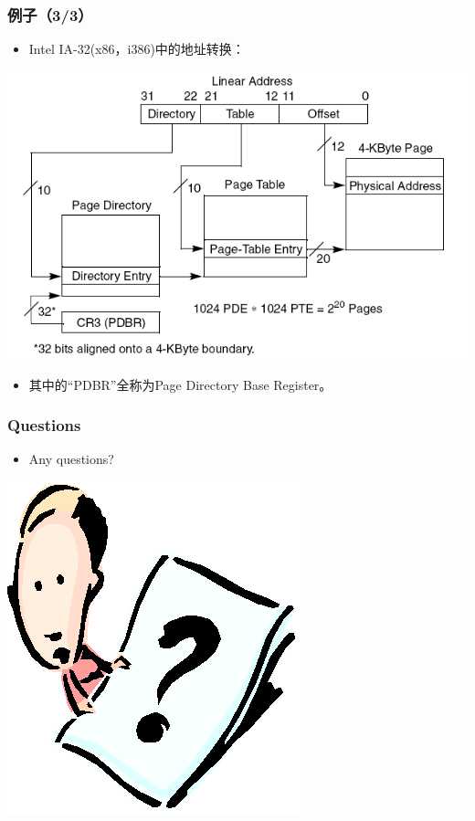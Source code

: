\documentclass[CJKutf8,xcolor=pdftex,dvipsnames,table]{beamer}
\begin{document}
\begin{CJK*}{UTF8}{song}
  \begin{frame}
  \frametitle{例子（3/3）} \pause
  \begin{itemize}
  \item{Intel IA-32(x86，i386)中的地址转换：} \pause
  \end{itemize}
  \begin{center}
    \includegraphics[scale=0.5]{x86atl2p} \pause
  \end{center}
  \begin{itemize}
  \item{其中的“PDBR”全称为Page Directory Base Register。}
  \end{itemize}
  \end{frame}
  
  \begin{frame}
  \frametitle{Questions}
  \begin{itemize}
  \item{Any questions?}
  \end{itemize}
  \begin{center}
    \includegraphics[scale=.5]{question}
  \end{center}
  \end{frame}
  

\end{CJK*}
\end{document}
